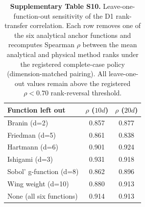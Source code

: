 \begin{table}[htbp]
\centering
\caption{\textbf{Supplementary Table S10.} Leave-one-function-out sensitivity of the D1 rank-transfer correlation. Each row removes one of the six analytical anchor functions and recomputes Spearman $\rho$ between the mean analytical and physical method ranks under the registered complete-case policy (dimension-matched pairing). All leave-one-out values remain above the registered $\rho<0.70$ rank-reversal threshold.}
\label{tab:si_d1_loo}
\SITableFont
\begin{tabular}{@{}lcc@{}}
\toprule
\textbf{Function left out} & $\rho$ ($10d$) & $\rho$ ($20d$) \\
\midrule
Branin (d=2) & 0.857 & 0.877 \\
Friedman (d=5) & 0.861 & 0.838 \\
Hartmann (d=6) & 0.901 & 0.924 \\
Ishigami (d=3) & 0.931 & 0.918 \\
Sobol' g-function (d=8) & 0.862 & 0.896 \\
Wing weight (d=10) & 0.880 & 0.913 \\
\midrule
None (all six functions) & 0.914 & 0.913 \\
\bottomrule
\end{tabular}
\end{table}
